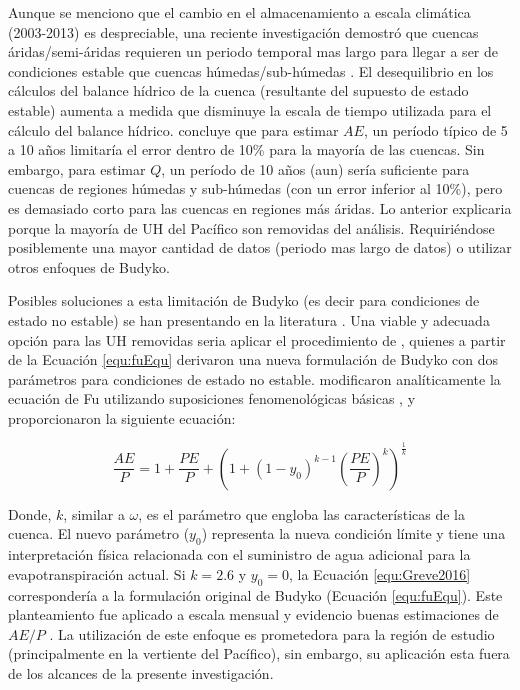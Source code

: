 \documentclass[12pt]{article}
\begin{document}
\clearpage

\clearpage

Aunque se menciono que el cambio en el almacenamiento a escala climática (2003-2013) es despreciable, una reciente investigación demostró que cuencas áridas/semi-áridas requieren un periodo temporal mas largo para llegar a ser de condiciones estable que cuencas húmedas/sub-húmedas \citep{hanassessing}. El desequilibrio en los cálculos del balance hídrico de la cuenca (resultante del supuesto de estado estable) aumenta a medida que disminuye la escala de tiempo utilizada para el cálculo del balance hídrico. \citet{hanassessing} concluye que para estimar $AE$, un período típico de 5 a 10 años limitaría el error dentro de 10\% para la mayoría de las cuencas. Sin embargo, para estimar $Q$, un período de 10 años (aun) sería suficiente para cuencas de regiones húmedas y sub-húmedas (con un error inferior al 10\%), pero es demasiado corto para las cuencas en regiones más áridas. Lo anterior explicaria porque la mayoría de UH del Pacífico son removidas del análisis. Requiriéndose posiblemente una mayor cantidad de datos (periodo mas largo de datos) o utilizar otros enfoques de Budyko.

Posibles soluciones a esta limitación de Budyko (es decir para condiciones de estado no estable) se han presentando en la literatura \citep{greve2016two,moussa2016budyko,fathi2019new,mianabadi2020budyko}. Una viable y adecuada opción para las UH removidas seria aplicar el procedimiento de \citet{greve2016two}, quienes a partir de la Ecuación \ref{equ:fuEqu} \citep{Fu1981,Zhang2004} derivaron una nueva formulación de Budyko con dos parámetros para condiciones de estado no estable. \citet{greve2016two} modificaron analíticamente la ecuación de Fu utilizando suposiciones fenomenológicas básicas \citep[similar a][]{Zhang2004}, y proporcionaron la siguiente ecuación:

\begin{equation}
    \frac{AE}{P} = 1 + \frac{PE}{P} + \left ( 1 + \left ( 1 - y_{0} \right )^{k-1} \left (\frac{PE}{P}  \right )^{k} \right )^{\frac{1}{k}}
    \label{equ:Greve2016}
\end{equation}

Donde, $k$, similar a $\omega$, es el parámetro que engloba las características de la cuenca. El nuevo parámetro ($y_{0}$) representa la nueva condición límite y tiene una interpretación física relacionada con el suministro de agua adicional para la evapotranspiración actual. Si $k=2.6$ y $y_{0}=0$, la Ecuación \ref{equ:Greve2016} correspondería a la formulación original de Budyko (Ecuación \ref{equ:fuEqu}). Este planteamiento fue aplicado a escala mensual y evidencio buenas estimaciones de $AE/P$ \citep{greve2016two}. La utilización de este enfoque es prometedora para la región de estudio (principalmente en la vertiente del Pacífico), sin embargo, su aplicación esta fuera de los alcances de la presente investigación. 
\end{document}
